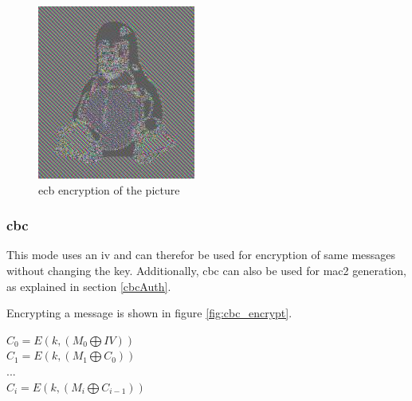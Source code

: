 \begin{minipage}{\linewidth}
\begin{minipage}{0.4\linewidth}
\begin{figure}[H]
              \includegraphics[width=\linewidth]{figures/TuxECB.png}
              \caption{\gls{ecb} encryption of the picture}
              \label{fig:tuxecb}
          \end{figure}
      \end{minipage}
  \end{minipage}

\subsubsection{\gls{cbc}}

This mode uses an \gls{iv} and can therefor be used for encryption of same messages without changing the key. Additionally, \gls{cbc} can also be used
for \gls{mac2} generation, as explained in section \ref{cbcAuth}.

Encrypting a message is shown in figure \ref{fig:cbc_encrypt}.

\begin{center}
$ C_0 = E(k, (M_0 \bigoplus IV ) )  $
\\
$ C_1 = E(k, (M_1  \bigoplus C_0) ) $
\\
$...$
\\
$ C_i = E(k, (M_i \bigoplus C_{i-1} ) )  $
\end{center}

